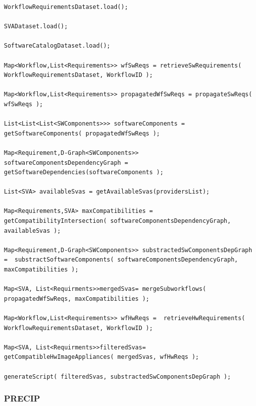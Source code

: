 \begin{lstlisting}[caption={Pseudo-code overview of the Infrastructure Specification Algorithm (ISA).},label={lst:pseudo}]
WorkflowRequirementsDataset.load();

SVADataset.load();

SoftwareCatalogDataset.load();

Map<Workflow,List<Requirements>> wfSwReqs = retrieveSwRequirements( WorkflowRequirementsDataset, WorkflowID );

Map<Workflow,List<Requirements>> propagatedWfSwReqs = propagateSwReqs( wfSwReqs );

List<List<List<SWComponents>>> softwareComponents = getSoftwareComponents( propagatedWfSwReqs );

Map<Requirement,D-Graph<SWComponents>> softwareComponentsDependencyGraph =    getSoftwareDependencies(softwareComponents );

List<SVA> availableSvas = getAvailableSvas(providersList);

Map<Requirements,SVA> maxCompatibilities = getCompatibilityIntersection( softwareComponentsDependencyGraph, availableSvas );

Map<Requirement,D-Graph<SWComponents>> substractedSwComponentsDepGraph =  substractSoftwareComponents( softwareComponentsDependencyGraph, maxCompatibilities );

Map<SVA, List<Requirments>>mergedSvas= mergeSubworkflows( propagatedWfSwReqs, maxCompatibilities );

Map<Workflow,List<Requirements>> wfHwReqs =  retrieveHwRequirements( WorkflowRequirementsDataset, WorkflowID );

Map<SVA, List<Requirments>>filteredSvas= getCompatibleHwImageAppliances( mergedSvas, wfHwReqs );

generateScript( filteredSvas, substractedSwComponentsDepGraph );
\end{lstlisting}



\subsubsection{PRECIP}

